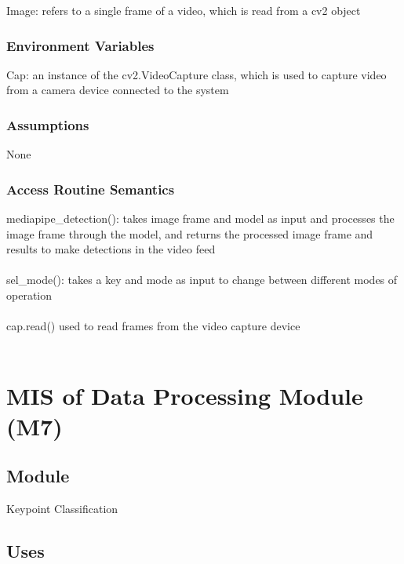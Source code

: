 \documentclass[12pt, titlepage]{article}
\begin{document}
Image: refers to a single frame of a video, which is read from a cv2 object\\

\subsubsection{Environment Variables}

Cap: an instance of the cv2.VideoCapture class, which is used to capture video from a camera device connected to the system\\

\subsubsection{Assumptions}

None\\

\subsubsection{Access Routine Semantics}

mediapipe\_detection(): takes image frame and model as input and processes the image frame through the model, and returns the processed image frame and results to make detections in the video feed\\
\\
sel\_mode(): takes a key and mode as input to change between different modes of operation\\
\\
cap.read() used to read frames from the video capture device\\

~\newpage

\section{MIS of Data Processing Module (M7)} \label{M6}

\subsection{Module}

Keypoint Classification\\

\subsection{Uses}
\end{document}
